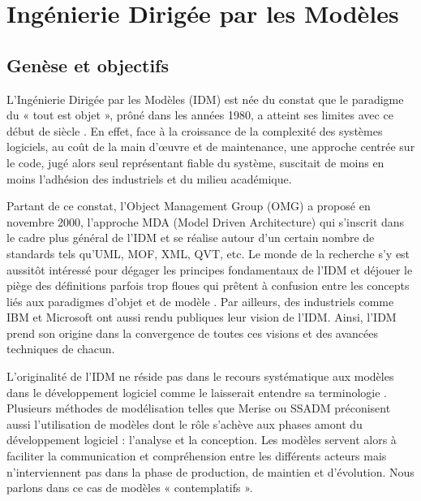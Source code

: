 \chapter{Ingénierie Dirigée par les Modèles}
\label{chap:EA}
 

\section{Genèse et objectifs}

L'Ingénierie Dirigée par les Modèles (IDM) est née du constat que le paradigme 
du « tout est objet », prôné dans les années 1980, a atteint ses limites avec ce 
début de siècle \cite{greenfield2004software}. En effet, face à la croissance de 
la complexité des systèmes logiciels, au coût de la main d'œuvre et de 
maintenance, une approche centrée sur le code, jugé alors seul représentant 
fiable du système, suscitait de moins en moins l'adhésion des industriels et du 
milieu académique. 

Partant de ce constat, l'Object Management Group (OMG) a proposé en novembre 
2000, l'approche MDA (Model Driven Architecture) qui s'inscrit dans le cadre 
plus général de l'IDM et se réalise autour d'un certain nombre de standards tels 
qu'UML, MOF, XML, QVT, etc. Le monde de la recherche s'y est aussitôt intéressé 
pour dégager les principes fondamentaux de l'IDM 
\cite{bezivin2001towards}\cite{kent2002model} \cite{de2002using} et déjouer le 
piège des définitions parfois trop floues qui prêtent à confusion entre les 
concepts liés aux paradigmes d'objet et de modèle \cite{bezivin2004search}. Par 
ailleurs, des industriels comme IBM \cite{booch2004mda} et Microsoft 
\cite{greenfield2004software} ont aussi rendu publiques leur vision de l'IDM. 
Ainsi, l'IDM prend son origine dans la convergence de toutes ces visions et des 
avancées techniques de chacun.

L'originalité de l'IDM ne réside pas dans le recours systématique aux modèles 
dans le développement logiciel comme le laisserait entendre sa terminologie  
\cite{bezivin2004rapport}. Plusieurs méthodes de modélisation telles que Merise 
ou SSADM préconisent aussi l'utilisation de modèles dont le rôle s'achève aux 
phases amont du développement logiciel : l'analyse et la conception. Les modèles 
servent alors à faciliter la communication et compréhension entre les différents 
acteurs mais n'interviennent pas dans la phase de production, de maintien et 
d'évolution. Nous parlons dans ce cas de modèles « contemplatifs ». 

